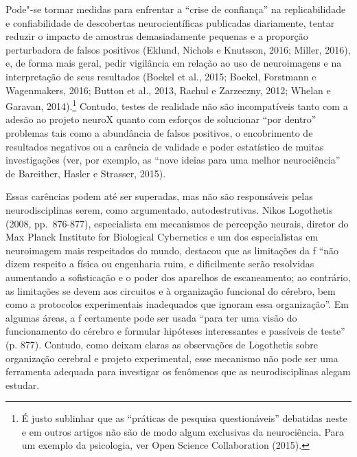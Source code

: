 Pode"-se tormar medidas para enfrentar a ``crise de confiança'' na
replicabilidade e confiabilidade de descobertas neurocientíficas
publicadas diariamente, tentar reduzir o impacto de amostras
demasiadamente pequenas e a proporção perturbadora de
falsos positivos (Eklund, Nichols e Knutsson, 2016; Miller, 2016), e, de
forma mais geral, pedir vigilância em relação ao uso de neuroimagens e
na interpretação de seus resultados (Boekel et al., 2015; Boekel,
Forstmann e Wagenmakers, 2016; Button et al., 2013, Rachul e Zarzeczny,
2012; Whelan e Garavan, 2014).\footnote[9]{É justo sublinhar que as ``práticas de pesquisa questionáveis''
debatidas neste e em outros artigos não são de modo algum exclusivas da
neurociência. Para um exemplo da psicologia, ver Open Science
Collaboration (2015).} Contudo, testes de
realidade não são incompatíveis tanto com a adesão ao projeto neuroX
quanto com esforços de solucionar ``por dentro'' problemas tais como a
abundância de falsos positivos, o encobrimento de resultados negativos
ou a carência de validade e poder estatístico de muitas investigações
(ver, por exemplo, as ``nove ideias para uma melhor neurociência'' de
Bareither, Hasler e Strasser, 2015).

Essas carências podem até ser superadas, mas não são responsáveis pelas
neurodisciplinas serem, como argumentado, autodestrutivas. Nikos
Logothetis (2008, pp.~876-877), especialista em mecanismos de percepção
neurais, diretor do Max Planck Institute for Biological Cybernetics e um
dos especialistas em neuroimagem mais respeitados do mundo,
destacou que as limitações da f ``não dizem respeito a física ou
engenharia ruim, e dificilmente serão resolvidas aumentando a
sofisticação e o poder dos aparelhos de escaneamento; ao contrário, as
limitações se devem aos circuitos e à organização funcional do cérebro,
bem como a protocolos experimentais inadequados que ignoram essa
organização''. Em algumas áreas, a f certamente pode ser usada ``para
ter uma visão do funcionamento do cérebro e formular hipóteses
interessantes e passíveis de teste'' (p. 877). Contudo, como deixam
claras as observações de Logothetis sobre organização
cerebral e projeto experimental, esse mecanismo não pode ser uma
ferramenta adequada para investigar os fenômenos que as neurodisciplinas
alegam estudar.

